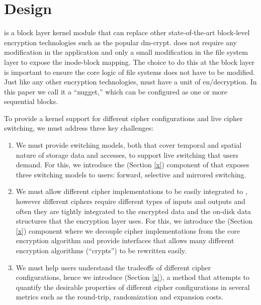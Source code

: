 \section{\sys Design}\label{sec:design}

%

\sys is a block layer kernel module that can replace other state-of-the-art
block-level encryption technologies such as the popular dm-crypt. \sys does not
require any modification in the application and only a small modification in the
file system layer to expose the inode-block mapping. The choice to do this at
the block layer is important to ensure the core logic of file systems does not
have to be modified. Just like any other encryption technologies, \sys must have
a unit of en/decryption. In this paper we call it a ``nugget,'' which can be
configured as one or more sequential blocks.

To provide a kernel support for different cipher configurations and live cipher
switching, we must address three key challenges:

\begin{enumerate}

\item We must provide switching models, both that cover temporal and spatial
  nature of storage data and accesses, to support live switching that users
  demand. For this, we introduce the \sysA (Section \ref{x}) component of \sys
  that exposes three switching models to users: forward, selective and mirrored
  switching.

\item We must allow different cipher implementations to be easily integrated to
  \sys, however different ciphers require different types of inputs and outputs
  and often they are tightly integrated to the encrypted data and the on-disk
  data structures that the encryption layer uses. For this, we introduce the
  \sysB (Section \ref{x}) component where we decouple cipher implementations
  from the core encryption algorithm and provide interfaces that allows many
  different encryption algorithms (``crypts'') to be rewritten easily.

\item We must help users understand the tradeoffs of different cipher
  configurations, hence we introduce \sysC (Section \ref{x}), a method that
  attempts to quantify the desirable properties of different cipher
  configurations in several metrics such as the round-trip, randomization and
  expansion costs.

\end{enumerate}

